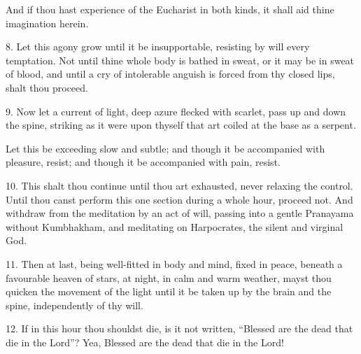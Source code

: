 And if thou hast experience of the Eucharist in both kinds, it shall aid thine imagination herein.

8. Let this agony grow until it be insupportable, resisting by will every temptation. Not until thine whole body is bathed in sweat, or it may be in sweat of blood, and until a cry of intolerable anguish is forced from thy closed lips, shalt thou proceed.

9. Now let a current of light, deep azure flecked with scarlet, pass up and down the spine, striking as it were upon thyself that art coiled at the base as a serpent.

Let this be exceeding slow and subtle; and though it be accompanied with pleasure, resist; and though it be accompanied with pain, resist.

10. This shalt thou continue until thou art exhausted, never relaxing the control. Until thou canst perform this one section during a whole hour, proceed not. And withdraw from the meditation by an act of will, passing into a gentle Pranayama without Kumbhakham, and meditating on Harpocrates, the silent and virginal God.

11. Then at last, being well-fitted in body and mind, fixed in peace, beneath a favourable heaven of stars, at night, in calm and warm weather, mayst thou quicken the movement of the light until it be taken up by the brain and the spine, independently of thy will.

12. If in this hour thou shouldst die, is it not written, \enquote{Blessed are the dead that die in the Lord}? Yea, Blessed are the dead that die in the Lord!
